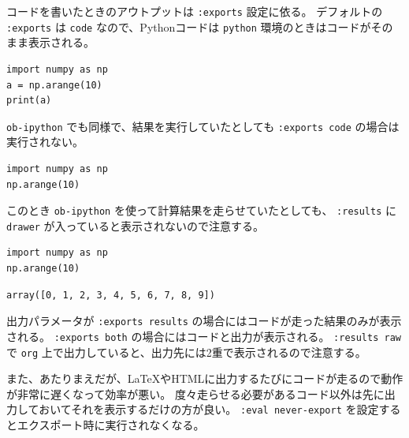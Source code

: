 \documentclass[a4paper, 10pt, notitlepage, uplatex, dvipdfmx]{jsarticle}
\begin{document}
コードを書いたときのアウトプットは \texttt{:exports} 設定に依る。
デフォルトの \texttt{:exports} は \texttt{code} なので、Pythonコードは \texttt{python} 環境のときはコードがそのまま表示される。
\begin{verbatim}
import numpy as np
a = np.arange(10)
print(a)
\end{verbatim}

\texttt{ob-ipython} でも同様で、結果を実行していたとしても \texttt{:exports code} の場合は実行されない。
\begin{verbatim}
import numpy as np
np.arange(10)
\end{verbatim}

このとき \texttt{ob-ipython} を使って計算結果を走らせていたとしても、 \texttt{:results} に \texttt{drawer} が入っていると表示されないので注意する。
\begin{verbatim}
import numpy as np
np.arange(10)
\end{verbatim}

\begin{verbatim}
array([0, 1, 2, 3, 4, 5, 6, 7, 8, 9])
\end{verbatim}


出力パラメータが \texttt{:exports results} の場合にはコードが走った結果のみが表示される。
\texttt{:exports both} の場合にはコードと出力が表示される。
\texttt{:results raw} で \texttt{org} 上で出力していると、出力先には2重で表示されるので注意する。

また、あたりまえだが、\LaTeX{}やHTMLに出力するたびにコードが走るので動作が非常に遅くなって効率が悪い。
度々走らせる必要があるコード以外は先に出力しておいてそれを表示するだけの方が良い。
\texttt{:eval never-export} を設定するとエクスポート時に実行されなくなる。
\end{document}
